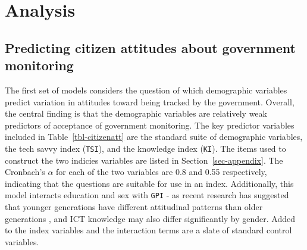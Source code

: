 \documentclass[
  number]{elsarticle}
\begin{document}
\section{Analysis}\label{sec-analysis}

\subsection{Predicting citizen attitudes about government
monitoring}\label{predicting-citizen-attitudes-about-government-monitoring}

The first set of models considers the question of which demographic
variables predict variation in attitudes toward being tracked by the
government. Overall, the central finding is that the demographic
variables are relatively weak predictors of acceptance of government
monitoring. The key predictor variables included in
Table~\ref{tbl-citizenatt} are the standard suite of demographic
variables, the tech savvy index (\texttt{TSI}), and the knowledge index
(\texttt{KI}). The items used to construct the two indicies variables
are listed in Section~\ref{sec-appendix}. The Cronbach's \(\alpha\) for
each of the two variables are 0.8 and 0.55 respectively, indicating that
the questions are suitable for use in an index. Additionally, this model
interacts education and sex with \texttt{GPI} - as recent research has
suggested that younger generations have different attitudinal patterns
than older generations \citep{harmel2019, steinhardt2020}, and ICT
knowledge may also differ significantly by gender. Added to the index
variables and the interaction terms are a slate of standard control
variables.
\end{document}
